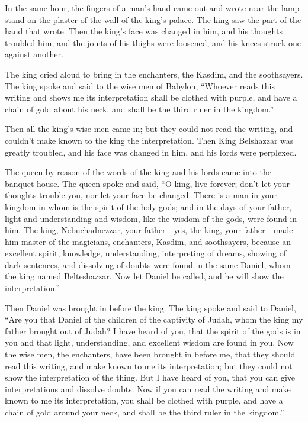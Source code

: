 \myverse{}In the same hour, the fingers of a man’s hand came out and wrote
near the lamp stand on the plaster of the wall of the king’s palace. The king saw the part of the hand
that wrote.
\myverse{}Then the king’s face was changed in him, and his thoughts troubled him; and
the joints of his thighs were loosened, and his knees struck one against another.

\myverse{}The king cried aloud to bring in the enchanters, the Kasdim, and
the soothsayers. The king spoke and said to the wise men of Babylon, “Whoever reads this writing and shows
me its interpretation shall be clothed with purple, and have a chain of gold about his neck, and shall
be the third ruler in the kingdom.”

\myverse{}Then all the king’s wise men came in; but they could not read the
writing, and couldn’t make known to the king the interpretation.
\myverse{}Then King Belshazzar was greatly troubled, and his face was changed in him,
and his lords were perplexed.

\myverse{}The queen by reason of the words of the king and his lords came
into the banquet house. The queen spoke and said, “O king, live forever; don’t let your thoughts trouble
you, nor let your face be changed.
\myverse{}There is a man in your kingdom in whom is the spirit of the holy gods; and
in the days of your father, light and understanding and wisdom, like the wisdom of the gods, were found
in him. The king, Nebuchadnezzar, your father—yes, the king, your father—made him master of the magicians,
enchanters, Kasdim, and soothsayers,
\myverse{}because an excellent spirit, knowledge, understanding, interpreting of dreams,
showing of dark sentences, and dissolving of doubts were found in the same Daniel, whom the king named
Belteshazzar. Now let Daniel be called, and he will show the interpretation.”

\myverse{}Then Daniel was brought in before the king. The king spoke and
said to Daniel, “Are you that Daniel of the children of the captivity of Judah, whom the king my father
brought out of Judah?
\myverse{}I have heard of you, that the spirit of the gods is in you and that light,
understanding, and excellent wisdom are found in you.
\myverse{}Now the wise men, the enchanters, have been brought in before me, that they
should read this writing, and make known to me its interpretation; but they could not show the interpretation
of the thing.
\myverse{}But I have heard of you, that you can give interpretations and dissolve doubts.
Now if you can read the writing and make known to me its interpretation, you shall be clothed with purple,
and have a chain of gold around your neck, and shall be the third ruler in the kingdom.”

